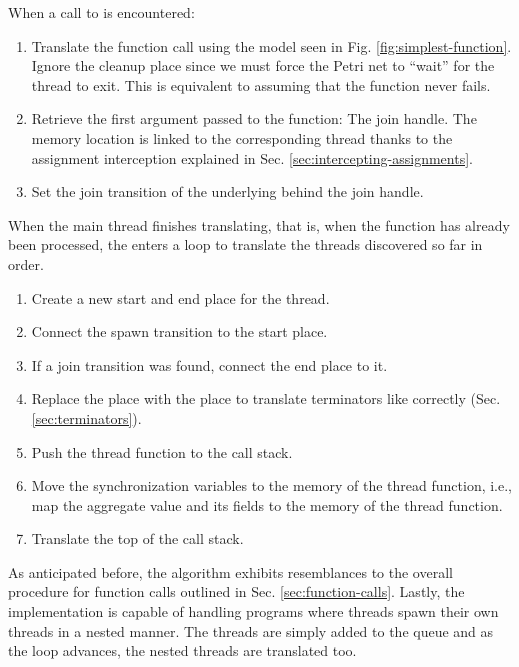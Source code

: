 When a call to  is encountered:

\begin{enumerate}
      \item Translate the function call using the model seen in Fig. \ref{fig:simplest-function}.
            Ignore the cleanup place since we must force the Petri net
            to ``wait'' for the thread to exit.
            This is equivalent to assuming that the  function never fails.
      \item Retrieve the first argument passed to the function: The join handle.
            The memory location is linked to the corresponding thread
            thanks to the assignment interception explained in Sec. \ref{sec:intercepting-assignments}.
      \item Set the join transition of the underlying  behind the join handle.
\end{enumerate}

When the main thread finishes translating, that is,
when the  function has already been processed,
the  enters a loop
to translate the threads discovered so far in order.

\begin{enumerate}
      \item Create a new start and end place for the thread.
      \item Connect the spawn transition to the start place.
      \item If a join transition was found, connect the end place to it.
      \item Replace the place  with the place 
            to translate terminators like  correctly (Sec. \ref{sec:terminators}).
      \item Push the thread function to the call stack.
      \item Move the synchronization variables to the memory of the thread function, i.e.,
            map the aggregate value and its fields to the memory of the thread function.
      \item Translate the top of the call stack.
\end{enumerate}

As anticipated before, the algorithm exhibits resemblances
to the overall procedure for function calls outlined in Sec. \ref{sec:function-calls}.
Lastly, the implementation is capable of handling programs
where threads spawn their own threads in a nested manner.
The threads are simply added to the queue and as the loop advances,
the nested threads are translated too.
